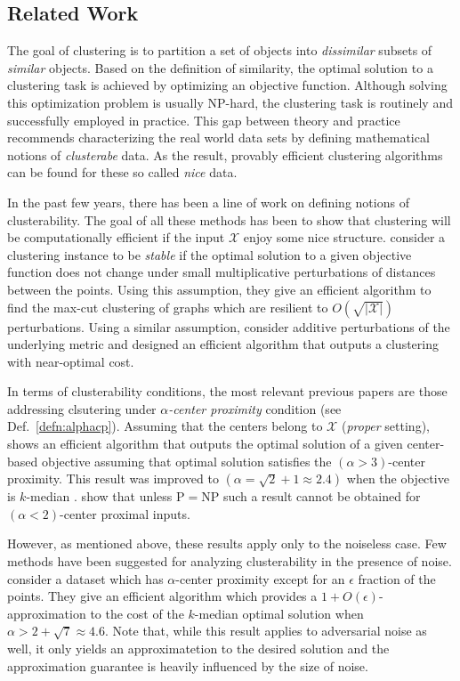 \documentclass[anon,12pt]{colt2016} %
\newcommand{\mc}{\mathcal}
\begin{document}
\subsection{Related Work}
The goal of clustering is to partition a set of objects into {\em dissimilar} subsets of {\em similar} objects. Based on the definition of similarity, the optimal solution to a clustering task is achieved by optimizing an objective function. Although solving this optimization problem is usually NP-hard, the clustering task is routinely and successfully employed in practice. This gap between theory and practice recommends characterizing the real world data sets by defining mathematical notions of {\em clusterabe} data. As the result, provably efficient clustering algorithms can be found for these so called {\em nice} data.  

In the past few years, there has been a line of work on defining notions of clusterability. The goal of all these methods has been to show that clustering will be computationally efficient if the input $\mc X$ enjoy some nice structure. \cite{bilu2012stable} consider a clustering instance to be \emph{stable} if the optimal solution to a given objective function does not change under small multiplicative perturbations of distances between the points. Using this assumption, they give an efficient algorithm to find the max-cut clustering of graphs which are resilient to $O(\sqrt{|\mc X|})$ perturbations. Using a similar assumption, \cite{ackerman2009clusterability} consider additive perturbations of the underlying metric and designed an efficient algorithm that outputs a clustering with near-optimal cost. 


In terms of clusterability conditions, the most relevant previous papers are those addressing clsutering under {\em $\alpha$-center proximity} condition (see Def.~\ref{defn:alphacp}).
Assuming that the centers belong to $\mc X$ ({\em proper} setting),  \cite{awasthi2012center} shows an efficient algorithm that outputs the optimal solution of a given center-based objective assuming that optimal solution satisfies the $(\alpha > 3)$-center proximity. This result was improved to $(\alpha = \sqrt{2} + 1 \approx 2.4)$ when the objective is $k$-median \cite{balcan2012clustering}. \cite{ben2014data} show that unless P$=$NP such a result cannot be obtained for $(\alpha <2)$-center proximal inputs.

However, as mentioned above, these results apply only to the noiseless case.
Few methods have been suggested for analyzing clusterability in the presence of noise. 
\cite{balcan2012clustering} consider a dataset which has $\alpha$-center proximity except for an $\epsilon$ fraction of the points. They give an efficient algorithm which provides a $1+O(\epsilon)$-approximation to the cost of the $k$-median optimal solution when $\alpha > 2+\sqrt{7} \approx 4.6$. Note that, while this result applies to adversarial noise as well, it only yields an approximatetion to the desired solution and  the approximation guarantee is heavily influenced by the size of noise.
\end{document}
